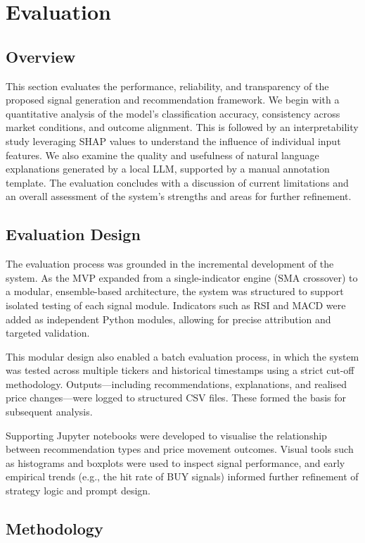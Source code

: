 \section{Evaluation}

\subsection{Overview}

This section evaluates the performance, reliability, and transparency of the proposed signal generation and recommendation framework. We begin with a quantitative analysis of the model’s classification accuracy, consistency across market conditions, and outcome alignment. This is followed by an interpretability study leveraging SHAP values to understand the influence of individual input features. We also examine the quality and usefulness of natural language explanations generated by a local LLM, supported by a manual annotation template. The evaluation concludes with a discussion of current limitations and an overall assessment of the system’s strengths and areas for further refinement.

\subsection{Evaluation Design}
The evaluation process was grounded in the incremental development of the system. As the MVP expanded from a single-indicator engine (SMA crossover) to a modular, ensemble-based architecture, the system was structured to support isolated testing of each signal module. Indicators such as RSI and MACD were added as independent Python modules, allowing for precise attribution and targeted validation.

This modular design also enabled a batch evaluation process, in which the system was tested across multiple tickers and historical timestamps using a strict cut-off methodology. Outputs—including recommendations, explanations, and realised price changes—were logged to structured CSV files. These formed the basis for subsequent analysis.

Supporting Jupyter notebooks were developed to visualise the relationship between recommendation types and price movement outcomes. Visual tools such as histograms and boxplots were used to inspect signal performance, and early empirical trends (e.g., the hit rate of BUY signals) informed further refinement of strategy logic and prompt design.

\subsection{Methodology}

